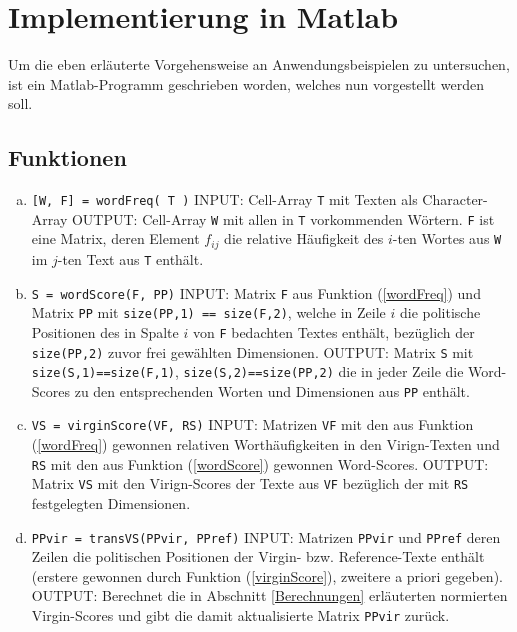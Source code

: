   
\section{Implementierung in Matlab}
Um die eben erläuterte Vorgehensweise an Anwendungsbeispielen zu untersuchen, ist ein Matlab-Programm geschrieben worden, welches nun vorgestellt werden soll.

\subsection{Funktionen}
\begin{enumerate}[(a)]
\item \label{wordFreq} \texttt{[W, F] = wordFreq( T )} \newline
      INPUT: Cell-Array \texttt{T} mit Texten als Character-Array \newline
      OUTPUT: Cell-Array \texttt{W} mit allen in \texttt{T} vorkommenden Wörtern. \texttt{F} ist eine Matrix, deren Element $f_{ij}$ die relative Häufigkeit des $i$-ten Wortes aus \texttt{W} im $j$-ten Text aus \texttt{T} enthält. 

\item \label{wordScore} \texttt{S = wordScore(F, PP)} \newline
      INPUT: Matrix \texttt{F} aus Funktion (\ref{wordFreq}) und Matrix \texttt{PP} mit \texttt{size(PP,1) == size(F,2)}, welche in Zeile $i$ die politische Positionen des in Spalte $i$ von \texttt{F} bedachten Textes enthält, bezüglich der \texttt{size(PP,2)} zuvor frei gewählten Dimensionen.  \newline
      OUTPUT: Matrix \texttt{S} mit \texttt{size(S,1)==size(F,1)}, \texttt{size(S,2)==size(PP,2)} die in jeder Zeile die Word-Scores zu den entsprechenden Worten und Dimensionen aus \texttt{PP} enthält.
 
   
\item \label{virginScore} \texttt{VS = virginScore(VF, RS)} \newline
      INPUT: Matrizen \texttt{VF} mit den aus Funktion (\ref{wordFreq}) gewonnen relativen Worthäufigkeiten in den Virign-Texten und \texttt{RS} mit den aus Funktion (\ref{wordScore}) gewonnen Word-Scores. \newline
      OUTPUT: Matrix \texttt{VS} mit den Virign-Scores der Texte aus \texttt{VF} bezüglich der mit \texttt{RS} festgelegten Dimensionen.
   
\item \label{transVS} \texttt{PPvir = transVS(PPvir, PPref)} \newline
      INPUT: Matrizen \texttt{PPvir} und \texttt{PPref} deren Zeilen die politischen Positionen der Virgin- bzw. Reference-Texte enthält (erstere gewonnen durch Funktion (\ref{virginScore}), zweitere a priori gegeben). \newline
      OUTPUT: Berechnet die in Abschnitt \ref{Berechnungen} erläuterten normierten Virgin-Scores und gibt die damit aktualisierte Matrix \texttt{PPvir} zurück.
   

\end{enumerate}
